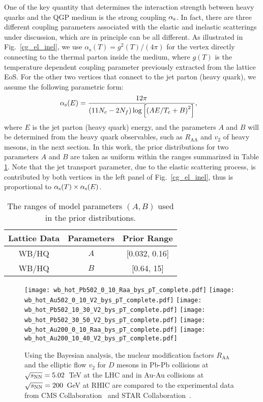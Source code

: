 \documentclass[aps,superscriptaddress,prc,twocolumn,nofootinbib]{revtex4}
\begin{document}
One of the key quantity that determines the interaction strength between heavy quarks and the QGP medium is the strong coupling $\alpha_{\rm s}$. In fact, there are three different coupling parameters associated with the elastic and inelastic scatterings under discussion, which are in principle can be all different. As illustrated in Fig.~\ref{cg_el_inel}, we use $\alpha_\mathrm{s}(T)=g^2(T)/(4\pi)$ for the vertex directly connecting to the thermal parton inside the medium, where $g(T)$ is the temperature dependent coupling parameter previously extracted from the lattice EoS. For the other two vertices that connect to the jet parton (heavy quark), we assume the following parametric form:
\begin{align}
\label{eq:paraAlphas}
\alpha_{\rm s}(E)&=\frac{12 \pi}{(11N_c - 2N_f) \log\left[\left(A  E/ T_\mathrm{c} + B\right)^2\right]},
\end{align}
where $E$ is the jet parton (heavy quark) energy, and the parameters $A$ and $B$ will be determined from the heavy quark observables, such as $R_\mathrm{AA}$ and $v_2$ of heavy mesons, in the next section.
In this work, the prior distributions for two parameters $A$ and $B$ are taken as uniform within the ranges summarized in Table \ref{tab:3}. {\color{red} Note that the jet transport parameter, due to the elastic scattering process, is contributed by both vertices in the left panel of Fig.~\ref{cg_el_inel}, thus is proportional to $\alpha_\mathrm{s}(T) \times \alpha_{\rm s}(E)$.} 


\begin{table}[htb]
\label{tab:3}
\centering
\vspace{-5pt}
\begin{tabular}{c|c|c}
 \hline
 Lattice Data & Parameters & Prior Range  \\
 \hline
  WB/HQ  & $A$ & [0.032, 0.16]    \\
  WB/HQ  & $B$ & [0.64, 15]  \\
  \hline
\end{tabular}
	\caption{The ranges of model parameters $(A,B)$ used in the prior distributions.}
\end{table}


\begin{figure*}[tbh]
\texttt{[image: wb\_hot\_Pb502\_0\_10\_Raa\_bys\_pT\_complete.pdf]}
\texttt{[image: wb\_hot\_Au502\_0\_10\_V2\_bys\_pT\_complete.pdf]}
\texttt{[image: wb\_hot\_Pb502\_10\_30\_V2\_bys\_pT\_complete.pdf]}
\texttt{[image: wb\_hot\_Pb502\_30\_50\_V2\_bys\_pT\_complete.pdf]}
\texttt{[image: wb\_hot\_Au200\_0\_10\_Raa\_bys\_pT\_complete.pdf]}
\texttt{[image: wb\_hot\_Au200\_10\_40\_V2\_bys\_pT\_complete.pdf]}
	\caption{Using the Bayesian analysis, the nuclear modification factors $R_\mathrm{AA}$ and the elliptic flow $v_2$ for $D$ mesons in Pb-Pb collisions at $\sqrt{s_{\rm NN}} = 5.02$~TeV at the LHC and in Au-Au collisions at $\sqrt{s_{\rm NN}}= 200$~GeV at RHIC are compared to the experimental data from CMS Collaboration~\cite{Sirunyan:2017xss, Sirunyan:2017plt} and STAR Collaboration~\cite{Adam:2018inb, Adamczyk:2017xur}.}
	\label{RAA-v2}
\end{figure*}
\end{document}
